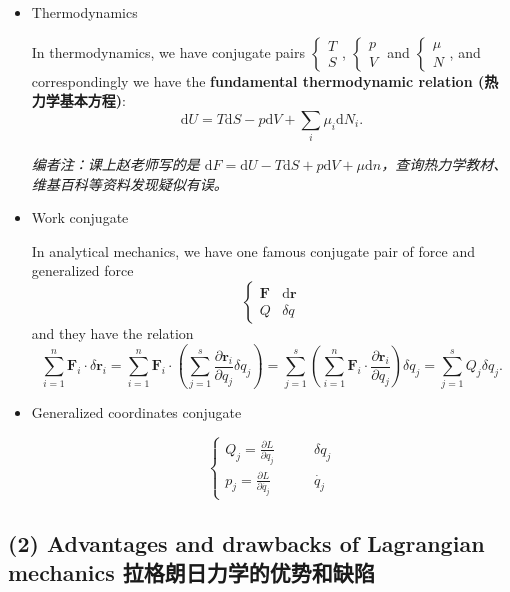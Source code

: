 \begin{itemize}
\tightlist{}
\item
  Thermodynamics

  In thermodynamics, we have conjugate pairs
  \(\left\{ \begin{array}{l}T \\ S \end{array} \right.\),
  \(\left\{ \begin{array}{l} p \\ V \end{array} \right.\) and
  \(\left\{ \begin{array}{l} \mu \\ N \end{array} \right.\), and
  correspondingly we have the \textbf{fundamental thermodynamic relation
  (热力学基本方程)}:
  \[\mathrm{d}U = T \mathrm{d}S - p \mathrm{d}V + \sum_i \mu_i \mathrm{d}N_i.\]

  \emph{编者注：课上赵老师写的是
  \(\mathrm{d}F = \mathrm{d}U - T \mathrm{d}S + p \mathrm{d}V + \mu \mathrm{d}n\)，查询热力学教材、维基百科等资料发现疑似有误。}
\item
  Work conjugate

  In analytical mechanics, we have one famous conjugate pair of force
  and generalized force \[\left\{
        \begin{array}{ll}
            \boldsymbol{F} & \mathrm{d} \boldsymbol{r} \\
            Q & \delta q
        \end{array}
    \right.\] and they have the relation
  \[\sum_{i = 1}^{n} \boldsymbol{F}_i \cdot \delta \boldsymbol{r}_i = \sum_{i = 1}^{n} \boldsymbol{F}_i \cdot \left( \sum_{j = 1}^{s} \frac{\partial \boldsymbol{r}_i}{\partial q_j} \delta q_j \right) = \sum_{j = 1}^{s} \left( \sum_{i = 1}^{n} \boldsymbol{F}_i \cdot \frac{\partial \boldsymbol{r}_i}{\partial q_j} \right) \delta q_j = \sum_{j = 1}^{s} Q_j \delta q_j.\]
\item
  Generalized coordinates conjugate

  \[\left\{
    \begin{array}{ll}
        \displaystyle Q_j = \frac{\partial L}{\partial q_j} \quad \quad & \delta q_j  \\[1.5ex]
        \displaystyle p_j = \frac{\partial L}{\partial \dot{q_j}} & \dot{q_j}
    \end{array}
    \right.\]
\end{itemize}

\subsection*{(2) Advantages and drawbacks of Lagrangian mechanics
拉格朗日力学的优势和缺陷}\label{advantages-and-drawbacks-of-lagrangian-mechanics-ux62c9ux683cux6717ux65e5ux529bux5b66ux7684ux4f18ux52bfux548cux7f3aux9677}

